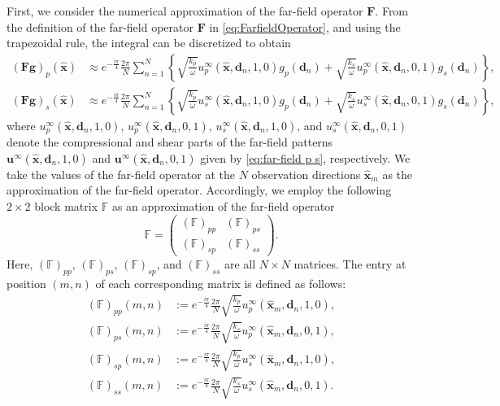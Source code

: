 \documentclass[11pt,reqno,twoside]{amsart}
\theoremstyle{definition}
\theoremstyle{remark}
\numberwithin{equation}{section}
\begin{document}
First, we consider the numerical approximation of the far-field operator $\mathbf{F}$. From the definition of the far-field operator $\mathbf{F}$ in \eqref{eq:FarfieldOperator}, and using the trapezoidal rule, the integral can be discretized to obtain
\begin{align*}
(\mathbf{F} \mathbf g)_p(\hat{\mathbf x}) &\approx e^{-\frac{i\pi}{4}} \frac{2\pi}{N} \sum_{n=1}^{N} \left\{ \sqrt{\frac{k_p}{\omega}} u_p^\infty(\hat{\mathbf x}, \mathbf d_n, 1, 0) g_p(\mathbf d_n) + \sqrt{\frac{k_s}{\omega}} u_p^\infty(\hat{\mathbf x}, \mathbf d_n, 0, 1) g_s(\mathbf d_n) \right\},\\
(\mathbf{F} \mathbf g)_s(\hat{\mathbf x}) &\approx e^{-\frac{i\pi}{4}} \frac{2\pi}{N} \sum_{n=1}^{N} \left\{ \sqrt{\frac{k_p}{\omega}} u_s^\infty(\hat{\mathbf x}, \mathbf d_n, 1, 0) g_p(\mathbf d_n) + \sqrt{\frac{k_s}{\omega}} u_s^\infty(\hat{\mathbf x}, \mathbf d_n, 0, 1) g_s(\mathbf d_n) \right\},
\end{align*}
where $u_p^\infty(\hat{\mathbf{x}}, \mathbf{d}_n, 1, 0)$, $u_p^\infty(\hat{\mathbf{x}}, \mathbf{d}_n, 0, 1)$, $u_s^\infty(\hat{\mathbf{x}}, \mathbf{d}_n, 1, 0)$, and $u_s^\infty(\hat{\mathbf{x}}, \mathbf{d}_n, 0, 1)$ denote the compressional and shear parts of the far-field patterns $\mathbf{u}^\infty(\hat{\mathbf{x}}, \mathbf{d}_n, 1, 0)$ and $\mathbf{u}^\infty(\hat{\mathbf{x}}, \mathbf{d}_n, 0, 1)$ given by \eqref{eq:far-field p s}, respectively.
We take the values of the far-field operator at the \( N \) observation directions \( \hat{\mathbf x}_m \) as the approximation of the far-field operator. Accordingly, we employ the following \( 2 \times 2 \) block matrix \( \mathbb{F} \) as an approximation of the far-field operator
\begin{equation*}%
\mathbb{F} = 
\begin{pmatrix}
	(\mathbb{F})_{pp} & (\mathbb{F})_{ps} \\
	(\mathbb{F})_{sp} & (\mathbb{F})_{ss}
\end{pmatrix}.
\end{equation*}
Here, \( (\mathbb{F})_{pp} \), \( (\mathbb{F})_{ps} \), \( (\mathbb{F})_{sp} \), and \( (\mathbb{F})_{ss} \) are all \( N \times N \) matrices. The entry at position \( (m,n) \) of each corresponding matrix is defined as follows:
\begin{align*}%
    (\mathbb{F})_{pp}(m,n) &:=  e^{-\frac{i\pi}{4}} \frac{2\pi}{N} \sqrt{\frac{k_p}{\omega}} u_p^\infty(\hat{\mathbf x}_m, \mathbf d_n, 1, 0),\\ %
    (\mathbb{F})_{ps}(m,n) &:=  e^{-\frac{i\pi}{4}} \frac{2\pi}{N} \sqrt{\frac{k_s}{\omega}} u_p^\infty(\hat{\mathbf x}_m, \mathbf d_n, 0, 1),\\ %
    (\mathbb{F})_{sp}(m,n) &:=  e^{-\frac{i\pi}{4}} \frac{2\pi}{N} \sqrt{\frac{k_p}{\omega}} u_s^\infty(\hat{\mathbf x}_m, \mathbf d_n, 1, 0),\\ %
    (\mathbb{F})_{ss}(m,n) &:=  e^{-\frac{i\pi}{4}} \frac{2\pi}{N} \sqrt{\frac{k_s}{\omega}} u_s^\infty(\hat{\mathbf x}_m, \mathbf d_n, 0, 1). %
\end{align*}
\end{document}
